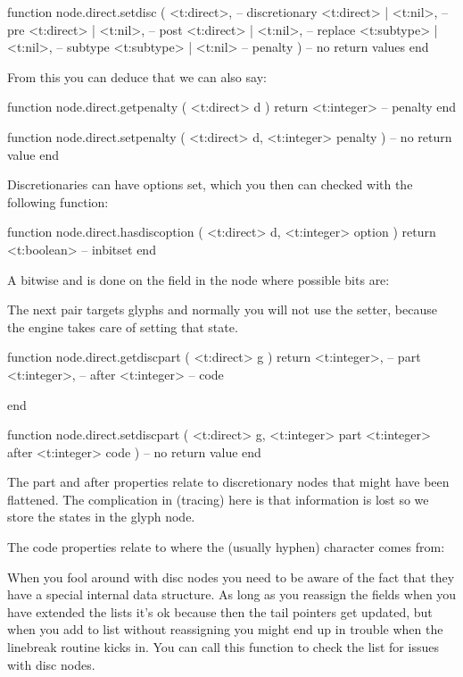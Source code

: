 \starttyping[option=LUA]
function node.direct.setdisc (
    <t:direct>,            -- discretionary
    <t:direct>  | <t:nil>, -- pre
    <t:direct>  | <t:nil>, -- post
    <t:direct>  | <t:nil>, -- replace
    <t:subtype> | <t:nil>, -- subtype
    <t:subtype> | <t:nil>  -- penalty
)
    -- no return values
end
\stoptyping

From this you can deduce that we can also say:

\starttyping[option=LUA]
function node.direct.getpenalty ( <t:direct> d )
    return <t:integer> -- penalty
end

function node.direct.setpenalty ( <t:direct> d, <t:integer> penalty )
    -- no return value
end
\stoptyping

Discretionaries can have options set, which you then can checked with
the following function:

\starttyping[option=LUA]
function node.direct.hasdiscoption ( <t:direct> d, <t:integer> option )
    return <t:boolean> -- inbitset
end
\stoptyping

A bitwise and is done on the field in the node where possible bits are:


The next pair targets glyphs and normally you will not use the setter, because
the engine takes care of setting that state.

\starttyping[option=LUA]
function node.direct.getdiscpart ( <t:direct> g )
    return
        <t:integer>, -- part
        <t:integer>, -- after
        <t:integer>  -- code

end

function node.direct.setdiscpart (
    <t:direct>  g,
    <t:integer> part
    <t:integer> after
    <t:integer> code
)
    -- no return value
end
\stoptyping

The part and after properties relate to discretionary nodes that might have been
flattened. The complication in (tracing) here is that information is lost so we
store the states in the glyph node.


The code properties relate to where the (usually hyphen) character comes from:


When you fool around with disc nodes you need to be aware of the fact that they
have a special internal data structure. As long as you reassign the fields when
you have extended the lists it's ok because then the tail pointers get updated,
but when you add to list without reassigning you might end up in trouble when
the linebreak routine kicks in. You can call this function to check the list for
issues with disc nodes.

